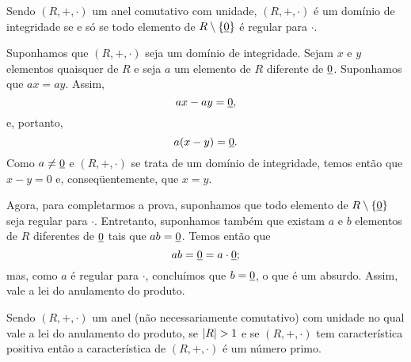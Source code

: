 \begin{Teo}\label{integridaderegular}
  Sendo $(R,+,\cdot)$ um anel comutativo com unidade, $(R,+,\cdot)$ é um
  domínio de integridade se e só se todo elemento de
  $R\setminus\left\{ \underline{0} \right\}$
  é regular para $\cdot$.
\end{Teo}

\begin{dem}
  Suponhamos que
  $(R,+,\cdot)$ seja um domínio de integridade. Sejam $x$ e $y$
  elementos quaisquer de $R$ e seja $a$ um elemento de $R$ diferente de
  $\underline{0}$. Suponhamos que $ax = ay$.
  Assim,
  \begin{equation*}
    ax - ay = \underline{0}\mathrm{,}
  \end{equation*}
  e, portanto,
  \begin{equation*}
    a(x-y) = \underline{0}\mathrm{.}
  \end{equation*}
  Como $a\neq\underline{0}$ e $(R,+,\cdot)$ se trata de um domínio
  de integridade,
  temos então que $x-y=0$ e, conseqüentemente, que $x=y$.

  Agora, para completarmos a prova, suponhamos que todo elemento de
  $R\setminus\left\{ \underline{0} \right\}$
  seja regular para $\cdot$. Entretanto, suponhamos
  também que existam $a$ e $b$ elementos de $R$
  diferentes de $\underline{0}$ tais que $ab=\underline{0}$. Temos então que
  \begin{equation*}
    ab = \underline{0} = a\cdot \underline{0}\mathrm{;}
  \end{equation*}
  mas, como $a$ é regular para $\cdot$, concluímos que $b=\underline{0}$, o que
  é um absurdo. Assim, vale a lei do anulamento do produto.
\end{dem}

\begin{Teo}\label{teocaracanel}
  Sendo $(R,+,\cdot)$ um anel (não necessariamente comutativo)
  com unidade no qual vale a lei do
  anulamento do produto, se $\cardi{R}>1$
  e se $(R,+,\cdot)$ tem característica positiva
  então a característica de $(R,+,\cdot)$ é um número
  primo.
\end{Teo}

